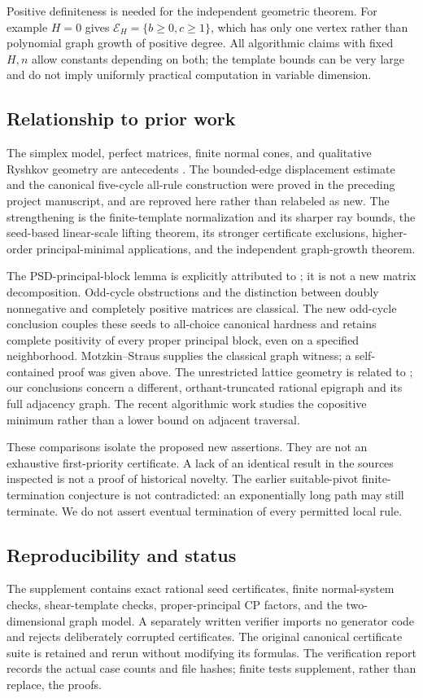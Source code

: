 Positive definiteness is needed for the independent geometric theorem. For example $H=0$ gives $\mathcal E_H=\{b\ge0,c\ge1\}$, which has only one vertex rather than polynomial graph growth of positive degree. All algorithmic claims with fixed $H,n$ allow constants depending on both; the template bounds can be very large and do not imply uniformly practical computation in variable dimension.

\subsection{Relationship to prior work}
The simplex model, perfect matrices, finite normal cones, and qualitative Ryshkov geometry are antecedents \cite{DSV,DS,OS}. The bounded-edge displacement estimate and the canonical five-cycle all-rule construction were proved in the preceding project manuscript, and are reproved here rather than relabeled as new. The strengthening is the finite-template normalization and its sharper ray bounds, the seed-based linear-scale lifting theorem, its stronger certificate exclusions, higher-order principal-minimal applications, and the independent graph-growth theorem.

The PSD-principal-block lemma is explicitly attributed to \cite{SM}; it is not a new matrix decomposition. Odd-cycle obstructions and the distinction between doubly nonnegative and completely positive matrices are classical. The new odd-cycle conclusion couples these seeds to all-choice canonical hardness and retains complete positivity of every proper principal block, even on a specified neighborhood. Motzkin--Straus supplies the classical graph witness; a self-contained proof was given above. The unrestricted lattice geometry is related to \cite{Erdahl,IE}; our conclusions concern a different, orthant-truncated rational epigraph and its full adjacency graph. The recent algorithmic work \cite{Minimum} studies the copositive minimum rather than a lower bound on adjacent traversal.

These comparisons isolate the proposed new assertions. They are not an exhaustive first-priority certificate. A lack of an identical result in the sources inspected is not a proof of historical novelty. The earlier suitable-pivot finite-termination conjecture is not contradicted: an exponentially long path may still terminate. We do not assert eventual termination of every permitted local rule.

\subsection{Reproducibility and status}
The supplement contains exact rational seed certificates, finite normal-system checks, shear-template checks, proper-principal CP factors, and the two-dimensional graph model. A separately written verifier imports no generator code and rejects deliberately corrupted certificates. The original canonical certificate suite is retained and rerun without modifying its formulas. The verification report records the actual case counts and file hashes; finite tests supplement, rather than replace, the proofs.

